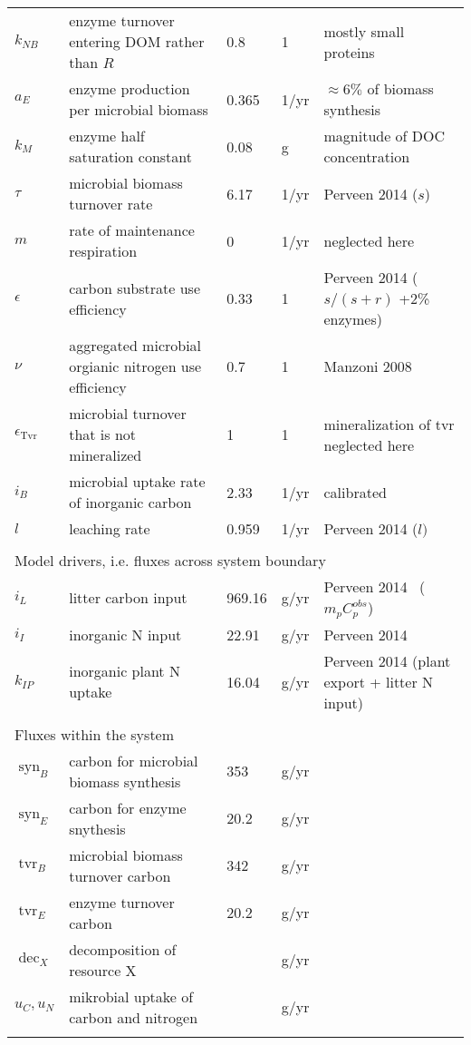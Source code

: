 \begin{table}[t]
\begin{tabular}{lllll}
$k_{NB}$ & enzyme turnover entering DOM rather than $R$ & 
0.8 & 1 & mostly small proteins \\
$a_{E}$ &  enzyme production per microbial biomass & 0.365 &
1/yr & $\approx 6\%$ of biomass synthesis \\ 
$k_{M}$ &  enzyme half saturation constant & 0.08 & g & magnitude of DOC
concentration \\
$\tau$ &  microbial biomass turnover rate & 6.17 & 1/yr & Perveen 2014
($s$) \\
$m$ & rate of maintenance respiration & 0 &
1/yr & neglected here \\
$\epsilon$ & carbon substrate use efficiency & 0.33 &
1 & Perveen 2014 ($s/(s+r)$ +2\% enzymes) \\
$\nu$ & aggregated microbial orgianic nitrogen use efficiency & 0.7 &
1 & Manzoni 2008 \\
$\epsilon_{\operatorname{Tvr}}$ & microbial turnover that is not
mineralized & 1 & 1 & mineralization of tvr neglected here  \\
$i_{B}$ & microbial uptake rate of inorganic carbon & 2.33 & 1/yr 
& calibrated \\
$l$ & leaching rate & 0.959 &
1/yr & Perveen 2014 ($l)$ \\
\\
\multicolumn{5}{l}{Model drivers, i.e. fluxes across system boundary}  \\ 
$i_{L}$ & litter carbon input & 969.16 & g/yr 
& Perveen 2014 \, ($m_p C^{obs}_p$)\\
$i_{I}$ & inorganic N input & 22.91 & g/yr 
& Perveen 2014 \\
$k_{IP}$ & inorganic plant N uptake & 16.04 &  g/yr 
& Perveen 2014 (plant export + litter N input)\\
\\
\multicolumn{5}{l}{Fluxes within the system} \\
$\operatorname{syn}_B $ & carbon for microbial biomass synthesis & 353 & g/yr &
\\
$\operatorname{syn}_E $ & carbon for enzyme snythesis & 20.2 & g/yr & \\
$\operatorname{tvr}_B $ & microbial biomass turnover carbon & 342 & g/yr & \\
$\operatorname{tvr}_E $ & enzyme turnover carbon &  20.2 & g/yr & \\
$\operatorname{dec}_X $ & decomposition of resource X & & g/yr & \\
$u_C,u_N$ & mikrobial uptake of carbon and nitrogen  & & g/yr & \\

\bottomhline
\end{tabular}
\end{table}


